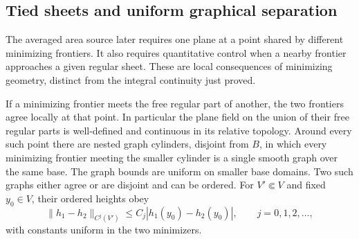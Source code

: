 \subsection{Tied sheets and uniform graphical separation}

The averaged area source later requires one plane at a point shared
by different minimizing frontiers. It also requires quantitative
control when a nearby frontier approaches a given regular sheet.
These are local consequences of minimizing geometry, distinct from
the integral continuity just proved.

\begin{proposition}
\label{q:geometry:sheets}
If a minimizing frontier meets the free regular part of another,
the two frontiers agree locally at that point. In particular the
plane field on the union of their free regular parts is well-defined
and continuous in its relative topology. Around every such point
there are nested graph cylinders, disjoint from $B$, in which every
minimizing frontier meeting the smaller cylinder is a single smooth
graph over the same base. The graph bounds are uniform on smaller
base domains. Two such graphs either agree or are disjoint and can
be ordered. For $V'\Subset V$ and fixed $y_0\in V$, their ordered
heights obey
\begin{equation}\label{q:geometry:graph-separation}
 \|h_1-h_2\|_{C^j(V')}\le C_j|h_1(y_0)-h_2(y_0)|,
 \qquad j=0,1,2,\ldots,
\end{equation}
with constants uniform in the two minimizers.
\end{proposition}

